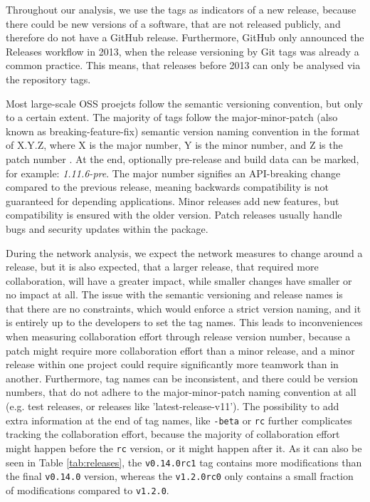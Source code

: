 Throughout our analysis, we use the tags as indicators of a new release, because there could be new versions of a software, that are not released publicly, and therefore do not have a GitHub release. Furthermore, GitHub only announced the Releases workflow in 2013, when the release versioning by Git tags was already a common practice. This means, that releases before 2013 can only be analysed via the repository tags.

Most large-scale OSS proejcts follow the semantic versioning convention, but only to a certain extent. The majority of tags follow the major-minor-patch (also known as breaking-feature-fix) semantic version naming convention in the format of X.Y.Z, where X is the major number, Y is the minor number, and Z is the patch number \cite{preston-wernerSemanticVersioning}. At the end, optionally pre-release and build data can be marked, for example: \textit{1.11.6-pre}. The major number signifies an API-breaking change compared to the previous release, meaning backwards compatibility is not guaranteed for depending applications. Minor releases add new features, but compatibility is ensured with the older version. Patch releases usually handle bugs and security updates within the package.

During the network analysis, we expect the network measures to change around a release, but it is also expected, that a larger release, that required more collaboration, will have a greater impact, while smaller changes have smaller or no impact at all. The issue with the semantic versioning and release names is that there are no constraints, which would enforce a strict version naming, and it is entirely up to the developers to set the tag names. This leads to inconveniences when measuring collaboration effort through release version number, because a patch might require more collaboration effort than a minor release, and a minor release within one project could require significantly more teamwork than in another. Furthermore, tag names can be inconsistent, and there could be version numbers, that do not adhere to the major-minor-patch naming convention at all (e.g. test releases, or releases like 'latest-release-v11'). The possibility to add extra information at the end of tag names, like \texttt{-beta} or \texttt{rc} further complicates tracking the collaboration effort, because the majority of collaboration effort might happen before the \texttt{rc} version, or it might happen after it. As it can also be seen in Table \ref{tab:releases}, the \texttt{v0.14.0rc1} tag contains more modifications than the final \texttt{v0.14.0} version, whereas the \texttt{v1.2.0rc0} only contains a small fraction of modifications compared to \texttt{v1.2.0}.

